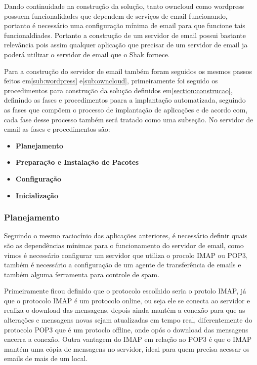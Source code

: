 Dando continuidade na construção da solução, tanto owncloud como wordpress
possuem funcionalidades que dependem de serviços de email funcionando, portanto
é necessário uma configuração mínima de email para que funcione tais funcionaldiades.
Portanto a construção de um servidor de email possui bastante relevância pois
assim qualquer aplicação que precisar de um servidor de email ja poderá utilizar
o servidor de email que o Shak fornece.

Para a construção do servidor de email também foram seguidos os mesmos passos
feitos em\ref{sub:wordpress} e\ref{sub:owncloud}, primeiramente foi seguido os
procedimentos para construção da solução definidos em\ref{section:construcao},
definindo as fases e procedimentos paara a implantação automatizada, seguindo as
fases que compõem o processo de implantação de aplicações e de acordo com\cite{omg2006},
cada fase desse processo também será tratado como uma subseção. No servidor de email
as fases e procedimentos são:

 \begin{itemize}
   \item  \textbf{Planejamento}
   \item  \textbf{Preparação e Instalação de Pacotes}
   \item  \textbf{Configuração}
   \item  \textbf{Inicialização}
 \end{itemize}

\subsubsection{Planejamento}

Seguindo o mesmo raciocínio das aplicações anteriores, é necessário definir
quais são as dependências mínimas para o funcionamento do servidor de email,
como vimos é necessário configurar um servidor que utiliza o procolo IMAP ou POP3,
também é necessário a configuração de um agente de transferência de emails e também
alguma ferramenta para controle de spam.

Primeiramente ficou definido que o protocolo escolhido seria o protolo IMAP, já
que o protocolo IMAP é um protocolo online, ou seja ele se conecta ao servidor
e realiza o download das mensagens, depois ainda  mantém a conexão para que
as alterações e mensagens novas sejam atualizadas em tempo real, diferentemente do
protocolo POP3 que é um protoclo offline, onde opós o download das mensagens encerra
a conexão. Outra vantagem do IMAP em relação ao POP3 é que o IMAP mantém uma cópia
de mensagens no servidor, ideal para quem precisa acessar os emails de mais de um local.

